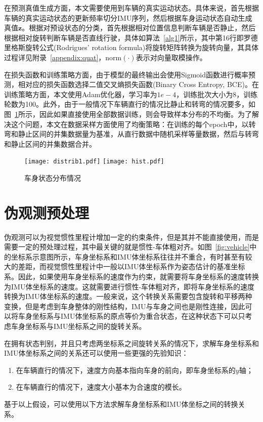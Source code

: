 在预测真值生成方面，本文需要使用到车辆的真实运动状态。具体来说，首先根据车辆的真实运动状态的更新频率切分IMU序列，然后根据车身运动状态自动生成真值$\symbf{z}$。根据对预设状态的分类，首先根据相对位置信息判断车辆是否静止，然后根据相对旋转判断车辆是否直线行驶，具体如算法~\ref{alg1}所示，其中第16行即罗德里格斯旋转公式(Rodrigues' rotation formula)\cite{dai2015euler}将旋转矩阵转换为旋转向量，其具体过程详见附录~\ref{appendix:quat}，$\text{norm}(\cdot)$表示对向量取模操作。


在损失函数和训练策略方面，由于模型的最终输出会使用Sigmoid函数进行概率预测，相对应的损失函数选择二值交叉熵损失函数(Binary Cross Entropy, BCE)。在训练策略方面，本文使用Adam优化器\cite{kingma2014adam}，学习率为$1e-4$，训练批次大小为8，训练轮数为100。此外，由于一般情况下车辆直行的情况比静止和转弯的情况要多，如图~\ref{fig:data_distrib}所示，因此如果直接使用全部数据训练，则会导致样本分布的不均衡。为了解决这个问题，本文在数据采样方面使用了均衡策略：在训练的每个epoch中，以转弯和静止区间的并集数据量为基准，从直行数据中随机采样等量数据，然后与转弯和静止区间的并集数据合并。

\begin{figure}
  \centering
  \texttt{[image: distrib1.pdf]}
  \texttt{[image: hist.pdf]}
  \caption{车身状态分布情况}
  \label{fig:data_distrib}
\end{figure}

\section{伪观测预处理}

伪观测可以为视觉惯性里程计增加一定的约束条件，但是其并不能直接使用，而是需要一定的预处理过程，其中最关键的就是惯性-车体粗对齐。如图~\ref{fig:vehicle}中的坐标系示意图所示，车身坐标系和IMU体坐标系往往并不重合，有时甚至有较大的差距，而视觉惯性里程计中一般以IMU体坐标系作为姿态估计的基准坐标系。因此，如果使用车身坐标系的速度作为约束，就需要将车身坐标系的速度转换为IMU体坐标系的速度。这就需要进行惯性-车体粗对齐，即将车身坐标系的速度转换为IMU体坐标系的速度。一般来说，这个转换关系需要包含旋转和平移两种变换，但是考虑到车身整体的刚性结构，IMU与车身之间也是刚性连接，因此可以将车身坐标系与IMU体坐标系的原点等价为重合状态，在这种状态下可以只考虑车身坐标系与IMU坐标系之间的旋转关系。

在拥有状态判别，并且只考虑两坐标系之间旋转关系的情况下，求解车身坐标系和IMU体坐标系之间的关系还可以使用一些更强的先验知识：
\begin{enumerate}
  \item 在车辆直行的情况下，速度方向基本指向车身的前向，即车身坐标系的$y$轴；
  \item 在车辆直行的情况下，速度大小基本为合速度的模长。
\end{enumerate}
基于以上假设，可以使用以下方法求解车身坐标系和IMU体坐标之间的转换关系。

